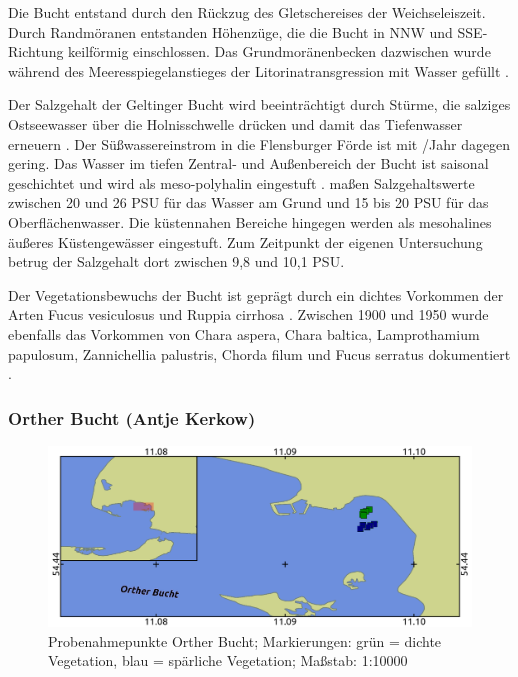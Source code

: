 Die Bucht entstand durch den Rückzug des Gletschereises der Weichseleiszeit. Durch Randmöranen entstanden Höhenzüge, die die Bucht in NNW und SSE-Richtung keilförmig einschlossen. Das Grundmoränenbecken dazwischen wurde während des Meeresspiegelanstieges der Litorinatransgression mit Wasser gefüllt \citep{reisch_1997}.

Der Salzgehalt der Geltinger Bucht wird beeinträchtigt durch Stürme, die salziges Ostseewasser über die Holnisschwelle drücken und damit das Tiefenwasser erneuern \citep{nikulina_2009}. Der Süßwassereinstrom  in die Flensburger Förde ist mit \unit{}{\kilo\cubic\metre}/Jahr \citep{lanu_2001} dagegen gering.
Das Wasser im tiefen Zentral- und Außenbereich der Bucht ist saisonal geschichtet und wird als meso-polyhalin eingestuft \citep{reimers_2005}. \cite{kandler_1963,exon_1972 and bluhm_1990} maßen Salzgehaltswerte zwischen 20 und 26 PSU für das Wasser am Grund und 15 bis 20 PSU für das Oberflächenwasser. Die küstennahen Bereiche hingegen werden als mesohalines äußeres Küstengewässer eingestuft. Zum Zeitpunkt der eigenen Untersuchung betrug der Salzgehalt dort zwischen 9,8 und 10,1 PSU.

Der Vegetationsbewuchs der Bucht ist geprägt durch ein dichtes Vorkommen der Arten Fucus vesiculosus und Ruppia cirrhosa . Zwischen 1900 und 1950 wurde ebenfalls das Vorkommen von Chara aspera, Chara baltica, Lamprothamium papulosum, Zannichellia palustris, Chorda filum und Fucus serratus dokumentiert \citep{mertens_2007}.


\subsubsection{Orther Bucht (Antje Kerkow)}

\begin{figure}[htb]
\centering
\includegraphics[width=1\textwidth]{images/OB.png}
\caption[Probenahmepunkte Orther Bucht]{Probenahmepunkte Orther Bucht; Markierungen: grün = dichte Vegetation, blau = spärliche Vegetation; Maßstab: 1:10000}
\label{OB}
\end{figure}



